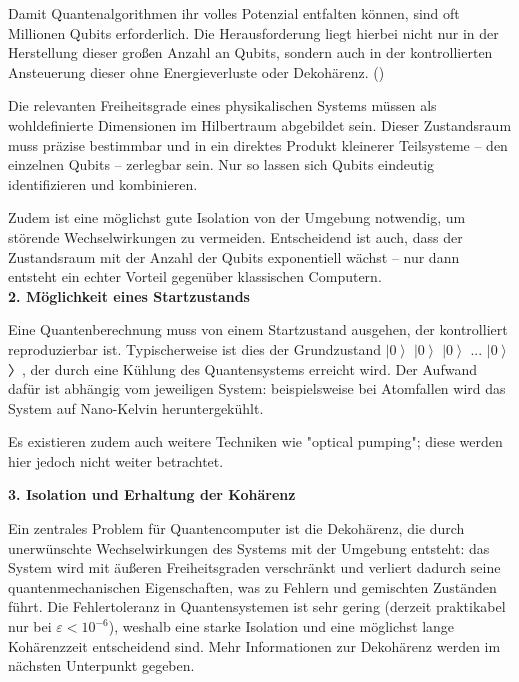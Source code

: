 Damit Quantenalgorithmen ihr volles Potenzial entfalten können, sind oft Millionen Qubits erforderlich. Die Herausforderung liegt hierbei nicht nur in der Herstellung dieser großen Anzahl an Qubits, sondern auch in der kontrollierten Ansteuerung dieser ohne Energieverluste oder Dekohärenz. 
(\cite{lapierre_introduction_2021})

Die relevanten Freiheitsgrade eines physikalischen Systems müssen als wohldefinierte Dimensionen im Hilbertraum abgebildet sein. Dieser Zustandsraum muss präzise bestimmbar und in ein direktes Produkt kleinerer Teilsysteme – den einzelnen Qubits – zerlegbar sein. Nur so lassen sich Qubits eindeutig identifizieren und kombinieren.

Zudem ist eine möglichst gute Isolation von der Umgebung notwendig, um störende Wechselwirkungen zu vermeiden. Entscheidend ist auch, dass der Zustandsraum mit der Anzahl der Qubits exponentiell wächst – nur dann entsteht ein echter Vorteil gegenüber klassischen Computern.
 \\

\textbf{{2. Möglichkeit eines Startzustands} }

Eine Quantenberechnung muss von einem Startzustand ausgehen, der kontrolliert reproduzierbar ist. Typischerweise ist dies der Grundzustand \(\left| 0\right\rangle\) \(\left| 0\right\rangle\) \(\left| 0\right\rangle\) ... \(\left| 0\right\rangle\)〉, der durch eine Kühlung des Quantensystems erreicht wird.  Der Aufwand dafür ist abhängig vom jeweiligen System: beispielsweise bei Atomfallen wird das System auf Nano-Kelvin heruntergekühlt. 

Es existieren zudem auch weitere Techniken wie "optical pumping"; diese werden hier jedoch nicht weiter betrachtet. 

\cite{lapierre_introduction_2021} 

\textbf{3. Isolation und Erhaltung der Kohärenz} 

Ein zentrales Problem für Quantencomputer ist die Dekohärenz, die durch unerwünschte Wechselwirkungen des Systems mit der Umgebung entsteht: das System wird mit äußeren Freiheitsgraden verschränkt und verliert dadurch seine quantenmechanischen Eigenschaften, was zu Fehlern und gemischten Zuständen führt. Die Fehlertoleranz in Quantensystemen ist sehr gering (derzeit praktikabel nur bei $\varepsilon < 10^{-6}$), weshalb eine starke Isolation und eine möglichst lange Kohärenzzeit entscheidend sind. Mehr Informationen zur Dekohärenz werden im nächsten Unterpunkt gegeben. \\


